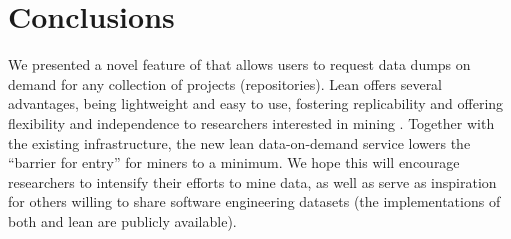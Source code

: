 
\section{Conclusions}
\label{sec:conclusions}

We presented a novel feature of \ght that allows users to request \gh data dumps on demand
for any collection of \gh projects (repositories).
Lean \ght offers several advantages, being lightweight and easy to use, fostering replicability
and offering flexibility and independence to researchers interested in mining \gh.
Together with the existing \ght infrastructure, the new lean data-on-demand service lowers 
the ``barrier for entry'' for \gh miners to a minimum.
We hope this will encourage researchers to intensify their efforts to mine \gh data, as well as
serve as inspiration for others willing to share software engineering datasets (the implementations
of both \ght and lean \ght are publicly available).

